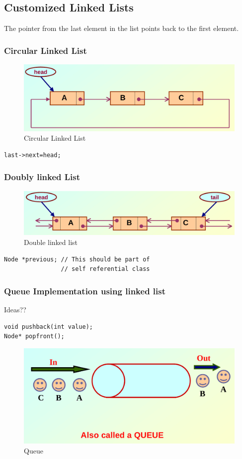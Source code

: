 \documentclass{beamer}
\newtheorem{Key points}{Key points}
\begin{document}
\subsection{Customized Linked Lists}
\begin{frame}[fragile]
The pointer from the last element in the list points
back to the first element.
  \frametitle{Circular Linked List}
  \begin{figure}
    \centering
         \includegraphics[width=1\columnwidth]{circle.png}
    \caption{Circular Linked List}
  \end{figure}
\begin{lstlisting}
last->next=head;
\end{lstlisting}
\end{frame}
\begin{frame}[fragile]
  \frametitle{Doubly linked List}
    \begin{figure}
    \centering
         \includegraphics[width=1\columnwidth]{double.png}
    \caption{Double linked list}
  \end{figure}
\begin{lstlisting}
Node *previous; // This should be part of
                // self referential class
\end{lstlisting}
\end{frame}
\begin{frame}[fragile]
\frametitle{Queue Implementation using linked list }
\begin{center}
\huge{Ideas??}
\end{center}
\begin{lstlisting}
void pushback(int value);
Node* popfront();
\end{lstlisting}
    \begin{figure}
    \centering
         \includegraphics[width=0.5\columnwidth]{queue.png}
    \caption{Queue}
  \end{figure}
\end{frame}
\end{document}
